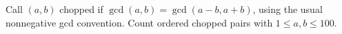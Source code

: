 Call $(a,b)$ chopped if $\gcd(a,b)=\gcd(a-b,a+b)$, using the usual nonnegative gcd convention. Count ordered chopped pairs with $1\le a,b\le100$.
